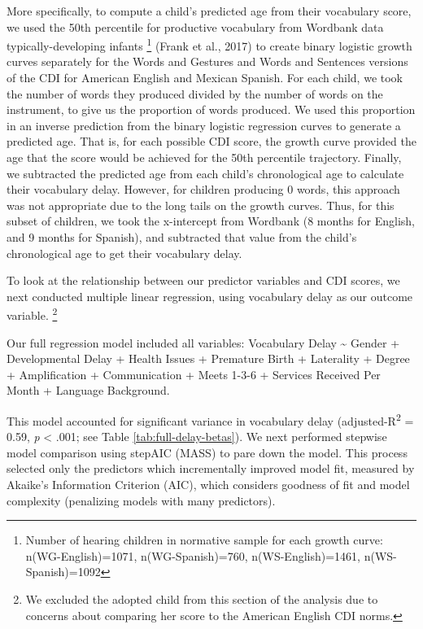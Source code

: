 \documentclass[english,man]{apa6}
\begin{document}
More specifically, to compute a child's predicted age from their vocabulary score, we used the 50th percentile for productive vocabulary from Wordbank data typically-developing infants \footnote{Number of hearing children in normative sample for each growth curve: n(WG-English)=1071, n(WG-Spanish)=760, n(WS-English)=1461, n(WS-Spanish)=1092} (Frank et al., 2017) to create binary logistic growth curves separately for the Words and Gestures and Words and Sentences versions of the CDI for American English and Mexican Spanish. For each child, we took the number of words they produced divided by the number of words on the instrument, to give us the proportion of words produced. We used this proportion in an inverse prediction from the binary logistic regression curves to generate a predicted age. That is, for each possible CDI score, the growth curve provided the age that the score would be achieved for the 50th percentile trajectory. Finally, we subtracted the predicted age from each child's chronological age to calculate their vocabulary delay. However, for children producing 0 words, this approach was not appropriate due to the long tails on the growth curves. Thus, for this subset of children, we took the x-intercept from Wordbank (8 months for English, and 9 months for Spanish), and subtracted that value from the child's chronological age to get their vocabulary delay.

To look at the relationship between our predictor variables and CDI scores, we next conducted multiple linear regression, using vocabulary delay as our outcome variable. \footnote{We excluded the adopted child from this section of the analysis due to concerns about comparing her score to the American English CDI norms.}

Our full regression model included all variables: Vocabulary Delay \textasciitilde{} Gender + Developmental Delay + Health Issues + Premature Birth + Laterality + Degree + Amplification + Communication + Meets 1-3-6 + Services Received Per Month + Language Background.

This model accounted for significant variance in vocabulary delay (adjusted-R\textsuperscript{2} = 0.59, \emph{p} \textless{} .001; see Table \ref{tab:full-delay-betas}). We next performed stepwise model comparison using stepAIC (MASS) to pare down the model. This process selected only the predictors which incrementally improved model fit, measured by Akaike's Information Criterion (AIC), which considers goodness of fit and model complexity (penalizing models with many predictors).
\end{document}
